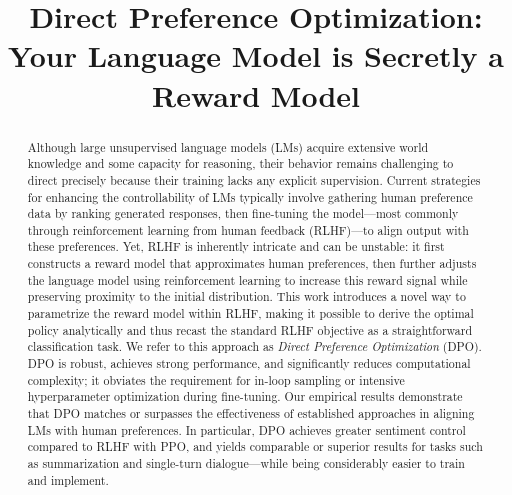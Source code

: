 \title{Direct Preference Optimization: Your Language Model is Secretly a Reward Model}

\begin{abstract}
Although large unsupervised language models (LMs) acquire extensive world knowledge and some capacity for reasoning, their behavior remains challenging to direct precisely because their training lacks any explicit supervision. Current strategies for enhancing the controllability of LMs typically involve gathering human preference data by ranking generated responses, then fine-tuning the model—most commonly through reinforcement learning from human feedback (RLHF)—to align output with these preferences. Yet, RLHF is inherently intricate and can be unstable: it first constructs a reward model that approximates human preferences, then further adjusts the language model using reinforcement learning to increase this reward signal while preserving proximity to the initial distribution. This work introduces a novel way to parametrize the reward model within RLHF, making it possible to derive the optimal policy analytically and thus recast the standard RLHF objective as a straightforward classification task. We refer to this approach as \textit{Direct Preference Optimization} (DPO). DPO is robust, achieves strong performance, and significantly reduces computational complexity; it obviates the requirement for in-loop sampling or intensive hyperparameter optimization during fine-tuning. Our empirical results demonstrate that DPO matches or surpasses the effectiveness of established approaches in aligning LMs with human preferences. In particular, DPO achieves greater sentiment control compared to RLHF with PPO, and yields comparable or superior results for tasks such as summarization and single-turn dialogue—while being considerably easier to train and implement.
\end{abstract}

